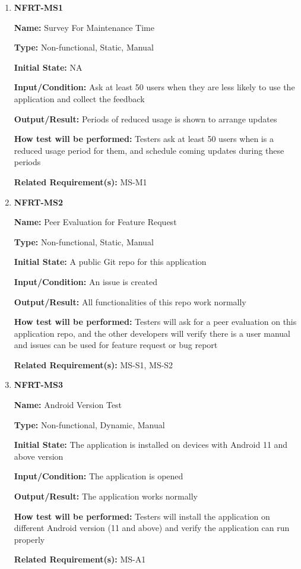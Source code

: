 \documentclass[12pt, titlepage]{article}
\begin{document}
\begin{enumerate}
\item{\textbf{NFRT-MS1}}

\textbf{Name:} Survey For Maintenance Time

\textbf{Type:} Non-functional, Static, Manual
					
\textbf{Initial State:} NA

\textbf{Input/Condition:} Ask at least 50 users when they are less likely to use the application and collect the feedback

\textbf{Output/Result:} Periods of reduced usage is shown to arrange updates

\textbf{How test will be performed:} Testers ask at least 50 users when is a reduced usage period for them, and schedule coming updates during these periods

\textbf{Related Requirement(s):} MS-M1

\item{\textbf{NFRT-MS2}}

\textbf{Name:} Peer Evaluation for Feature Request

\textbf{Type:} Non-functional, Static, Manual
					
\textbf{Initial State:} A public Git repo for this application

\textbf{Input/Condition:} An issue is created

\textbf{Output/Result:} All functionalities of this repo work normally

\textbf{How test will be performed:} Testers will ask for a peer evaluation on this application repo, and the other developers will verify there is a user manual and issues can be used for feature request or bug report

\textbf{Related Requirement(s):} MS-S1, MS-S2

\item{\textbf{NFRT-MS3}}

\textbf{Name:} Android Version Test

\textbf{Type:} Non-functional, Dynamic, Manual
					
\textbf{Initial State:} The application is installed on devices with Android 11 and above version

\textbf{Input/Condition:} The application is opened

\textbf{Output/Result:} The application works normally

\textbf{How test will be performed:} Testers will install the application on different Android version (11 and above) and verify the application can run properly

\textbf{Related Requirement(s):} MS-A1
\end{enumerate}
\end{document}
